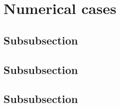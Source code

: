 \section{Numerical cases}
\label{sec51}


\lipsum[1]

\subsection{Subsubsection}
\label{sec511}

\lipsum[1]

\subsection{Subsubsection}
\label{sec512}

\lipsum[1]

\subsection{Subsubsection}
\label{sec513}

\lipsum[1]
